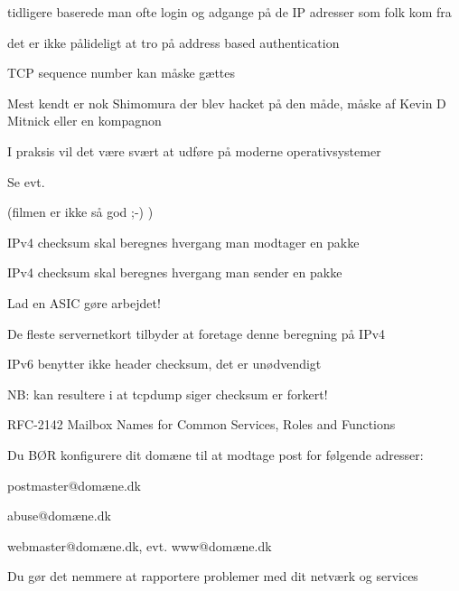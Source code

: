 
\begin{list1}
  \item tidligere baserede man ofte login og adgange på de IP adresser
  som folk kom fra
\item det er ikke pålideligt at tro på address based authentication
\item TCP sequence number kan måske gættes
\item Mest kendt er nok Shimomura der blev hacket på den måde, måske
  af Kevin D Mitnick eller en kompagnon
\item I praksis vil det være svært at udføre på moderne operativsystemer
\item Se evt. 
\item (filmen er ikke så god ;-) ) 
\end{list1}



\begin{list1}
\item IPv4 checksum skal beregnes hvergang man modtager en pakke
\item IPv4 checksum skal beregnes hvergang man sender en pakke
\vskip 1cm
\item Lad en ASIC gøre arbejdet!
\item De fleste servernetkort tilbyder at foretage denne beregning på IPv4
\item IPv6 benytter ikke header checksum, det er unødvendigt
\end{list1}
\vskip 1cm

\centerline{\hlkbig NB: kan resultere i at tcpdump siger checksum er forkert!}



\begin{list1}
\item RFC-2142 Mailbox Names for Common Services, Roles and Functions
\item Du BØR konfigurere dit domæne til at modtage post for følgende adresser:
\begin{list2}
\item postmaster@domæne.dk
\item abuse@domæne.dk
\item webmaster@domæne.dk, evt. www@domæne.dk
\end{list2}
\item Du gør det nemmere at rapportere problemer med dit netværk og services
\end{list1}

